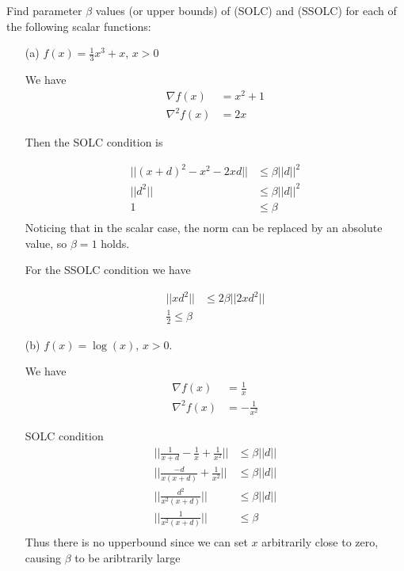 \documentclass[answers]{exam} %
\begin{document}
Find parameter $\beta$ values (or upper bounds)  of (SOLC) and (SSOLC) for each of the following scalar functions:
\begin{itemize}
\item[(a)] $f(x)=\frac{1}{3}x^3+x$, $x>0$
\begin{framed}
We have 
\begin{equation*}
\begin{aligned}
\nabla f(x) &= x^2 + 1 \\
\nabla^2 f(x) &= 2x
\end{aligned}
\end{equation*}

Then the SOLC condition is 

\begin{equation*}
\begin{aligned}
|| (x + d)^2 - x^2 - 2xd || &\leq \beta ||d||^2 \\ 
|| d^2 || &\leq \beta ||d||^2 \\ 
1 &\leq \beta \\ 
\end{aligned}
\end{equation*}
Noticing that in the scalar case, the norm can be replaced by an absolute value,
so $\beta = 1$ holds.

For the SSOLC condition we have

\begin{equation*}
\begin{aligned}
|| x d^2 || &\leq 2 \beta ||2xd^2|| \\ 
\frac{1}{2} \leq \beta
\end{aligned}
\end{equation*}


\end{framed}

\item[(b)] $f(x)=\log(x)$, $x>0$.
\begin{framed}
We have 
\begin{equation*}
\begin{aligned}
\nabla f(x) &= \frac{1}{x} \\
\nabla^2 f(x) &= - \frac{1}{x^2}
\end{aligned}
\end{equation*}




SOLC condition 
\begin{equation*}
\begin{aligned}
|| \frac{1}{x +d} - \frac{1}{x} + \frac{1}{x^2} || &\leq \beta ||d|| \\ 
|| \frac{-d}{x(x +d)} + \frac{1}{x^2} || &\leq \beta ||d|| \\ 
|| \frac{d^2}{x^2(x +d)} || &\leq \beta ||d|| \\ 
|| \frac{1}{x^2(x +d)}  || &\leq \beta \\ 
\end{aligned}
\end{equation*}
Thus there is no upperbound since we can set $x$ arbitrarily close to zero, causing   $\beta$ to be aribtrarily large



\end{framed}
\end{itemize}
\end{document}
